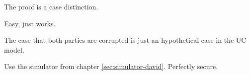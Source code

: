 The proof is a case distinction.



Easy, just works.




The case that both parties are corrupted is just an hypothetical case in the UC
model.



Use the simulator from chapter \ref{sec:simulator-david}. Perfectly secure.



